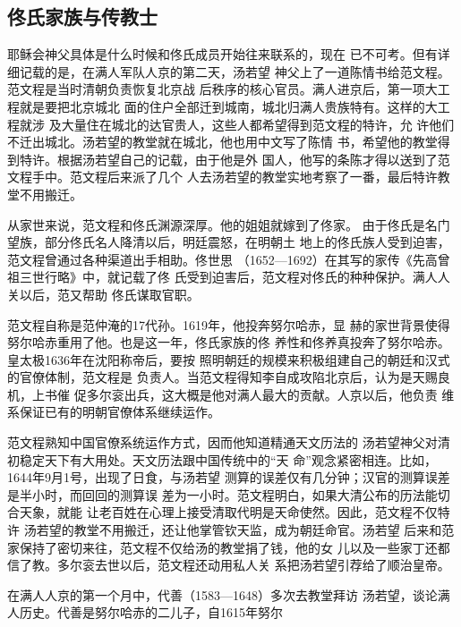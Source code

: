\subsection{佟氏家族与传教士}
\par
耶稣会神父具体是什么时候和佟氏成员开始往来联系的，现在%
已不可考。但有详细记载的是，在满人军队人京的第二天，汤若望%
神父上了一道陈情书给范文程。范文程是当时清朝负责恢复北京战%
后秩序的核心官员。满人进京后，第一项大工程就是要把北京城北%
面的住户全部迁到城南，城北归满人贵族特有。这样的大工程就涉%
及大量住在城北的达官贵人，这些人都希望得到范文程的特许，允%
许他们不迁出城北。汤若望的教堂就在城北，他也用中文写了陈情%
书，希望他的教堂得到特许。根据汤若望自己的记载，由于他是外%
国人，他写的条陈才得以送到了范文程手中。范文程后来派了几个%
人去汤若望的教堂实地考察了一番，最后特许教堂不用搬迁。%
\par
从家世来说，范文程和佟氏渊源深厚。他的姐姐就嫁到了佟家。%
由于佟氏是名门望族，部分佟氏名人降清以后，明廷震怒，在明朝土%
地上的佟氏族人受到迫害，范文程曾通过各种渠道出手相助。佟世思%
（1652—1692）在其写的家传《先高曾祖三世行略》中，就记载了佟%
氏受到迫害后，范文程对佟氏的种种保护。满人人关以后，范又帮助%
佟氏谋取官职。%
\par
范文程自称是范仲淹的17代孙。1619年，他投奔努尔哈赤，显%
赫的家世背景使得努尔哈赤重用了他。也是这一年，佟氏家族的佟%
养性和佟养真投奔了努尔哈赤。皇太极1636年在沈阳称帝后，要按%
照明朝廷的规模来积极组建自己的朝廷和汉式的官僚体制，范文程是%
负责人。当范文程得知李自成攻陷北京后，认为是天赐良机，上书催%
促多尔衮出兵，这大概是他对满人最大的贡献。人京以后，他负责%
维系保证已有的明朝官僚体系继续运作。%
\par
范文程熟知中国官僚系统运作方式，因而他知道精通天文历法的%
汤若望神父对清初稳定天下有大用处。天文历法跟中国传统中的“天%
命”观念紧密相连。比如，1644年9月1号，出现了日食，与汤若望%
测算的误差仅有几分钟；汉官的测算误差是半小时，而回回的测算误%
差为一小时。范文程明白，如果大清公布的历法能切合天象，就能%
让老百姓在心理上接受清取代明是天命使然。因此，范文程不仅特许%
汤若望的教堂不用搬迁，还让他掌管钦天监，成为朝廷命官。汤若望%
后来和范家保持了密切来往，范文程不仅给汤的教堂捐了钱，他的女%
儿以及一些家丁还都信了教。多尔衮去世以后，范文程还动用私人关%
系把汤若望引荐给了顺治皇帝。%
\par
在满人人京的第一个月中，代善（1583—1648）多次去教堂拜访%
汤若望，谈论满人历史。代善是努尔哈赤的二儿子，自1615年努尔%
